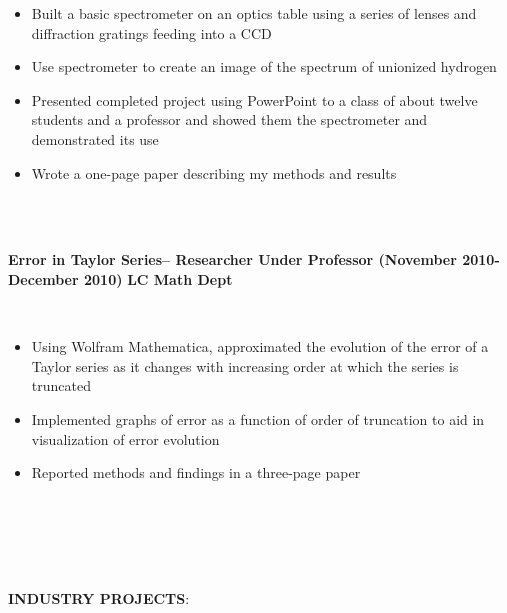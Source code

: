 \documentclass{article}
\begin{document}
\begin{itemize}
\item Built a basic spectrometer on an optics table using a series of lenses and diffraction gratings feeding into a CCD
\item Use spectrometer to create an image of the spectrum of unionized hydrogen
\item Presented completed project using PowerPoint to a class of about twelve students and a professor and showed them the spectrometer and demonstrated its use
\item Wrote a one-page paper describing my methods and results
\end{itemize}
\phantom \\
\phantom \\
%
%
%
%
\begin{vwcol}[widths={0.8,0.2}, sep=.8cm, justify=flush, rule=0pt, indent=0em]
\noindent \textbf{Error in Taylor Series– Researcher Under Professor (November 2010-December 2010)}
\newpage
\noindent \textbf{LC Math Dept}
\end{vwcol}
\phantom \\
\begin{itemize}
\item Using Wolfram Mathematica, approximated the evolution of the error of a Taylor series as it changes with increasing order at which the series is truncated
\item Implemented graphs of error as a function of order of truncation to aid in visualization of error evolution
\item Reported methods and findings in a three-page paper
\end{itemize}
\phantom \\
\phantom \\
%
%
%
%
\par
\phantom \\
\phantom \\
\noindent \textbf{INDUSTRY PROJECTS}: \\
\end{document}
